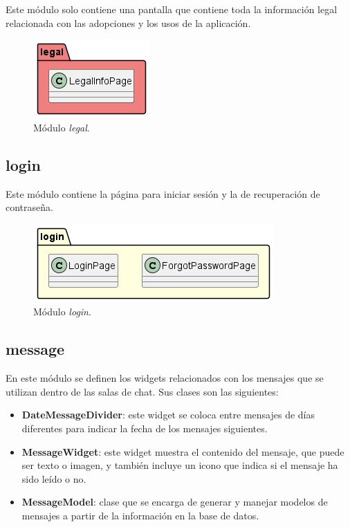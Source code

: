 \documentclass[a4paper, 12pt]{article}
\begin{document}
Este módulo solo contiene una pantalla que contiene toda la información legal relacionada con las adopciones y los usos de la aplicación.

\begin{figure}[H]
	\begin{center}
		{\includegraphics[]{diagram/Legal.png}\par}
		\caption{Módulo  \textit{legal}.}
	\end{center}
\end{figure}


\subsection*{login}


Este módulo contiene la página para iniciar sesión y la de recuperación de contraseña.

\begin{figure}[H]
	\begin{center}
		{\includegraphics[width=0.8\linewidth]{diagram/Login.png}\par}
		\caption{Módulo  \textit{login}.}
	\end{center}
\end{figure}


\subsection*{message}

En este módulo se definen los widgets relacionados con los mensajes que se utilizan dentro de las salas de chat. Sus clases son las siguientes:

\begin{itemize}[noitemsep]
	\item \textbf{DateMessageDivider}: este widget se coloca entre mensajes de días diferentes para indicar la fecha de los mensajes siguientes.
	\item \textbf{MessageWidget}: este widget muestra el contenido del mensaje, que puede ser texto o imagen, y también incluye un icono que indica si el mensaje ha sido leído o no.
	\item \textbf{MessageModel}: clase que se encarga de generar y manejar modelos de mensajes a partir de la información en la base de datos.
\end{itemize}
\end{document}
